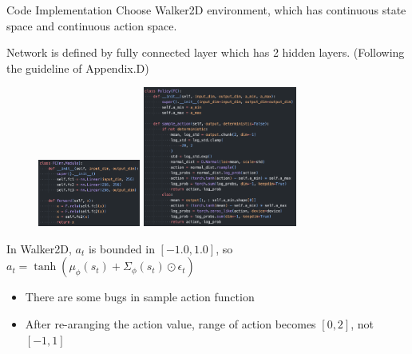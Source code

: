 \documentclass[8pt]{beamer}
\begin{document}
\begin{frame}{Code Implementation}
    Choose Walker2D environment, which has continuous state space and continuous action space.

    Network is defined by fully connected layer which has 2 hidden layers. (Following the guideline of Appendix.D)

    \begin{figure}
        \centering
        \includegraphics[width=0.3\textwidth]{fig1.png}
        \includegraphics[width=0.45\textwidth]{fig2.png}
    \end{figure}

    In Walker2D, $a_t$ is bounded in $[-1.0, 1.0]$, so $a_t = \tanh{(\mu_\phi(s_t)+ \Sigma_\phi(s_t) \odot \epsilon_t)}$

    \begin{itemize}
        \item There are some bugs in sample action function
        \item After re-aranging the action value, range of action becomes $[0, 2]$, not $[-1, 1]$
    \end{itemize}
\end{frame}
\end{document}
